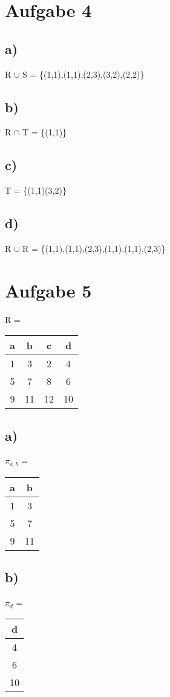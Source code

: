 \documentclass{article}
\begin{document}
	\section*{Aufgabe 4}
	\subsection*{a)}
	R $\cup$ S = \{(1,1),(1,1),(2,3),(3,2),(2,2)\}
	\subsection*{b)}
	R $\cap$ T = \{(1,1)\}
	\subsection*{c)}
	T = \{(1,1)(3,2)\}
	\subsection*{d)}
	R $\cup$ R = \{(1,1),(1,1),(2,3),(1,1),(1,1),(2,3)\}
	\section*{Aufgabe 5}
	R = 
	\begin{tabular}{c|c|c|c}
		a&b&c&d \\
		\hline
		1&3&2&4 \\
		\hline
		5&7&8&6 \\
		\hline
		9&11&12&10 \\
		\hline
	\end{tabular}
	\subsection*{a)}
	$\pi_{a,b}$ =
	\begin{tabular}{c|c}
		a&b \\
		\hline
		1&3 \\
		\hline
		5&7 \\
		\hline
		9&11 \\
		\hline
	\end{tabular} 
	\subsection*{b)}
	$\pi_{d}$ =
	\begin{tabular}{|c}
		d \\
		\hline
		4 \\
		\hline
		6 \\
		\hline
		10 \\
		\hline
	\end{tabular}
\end{document}
